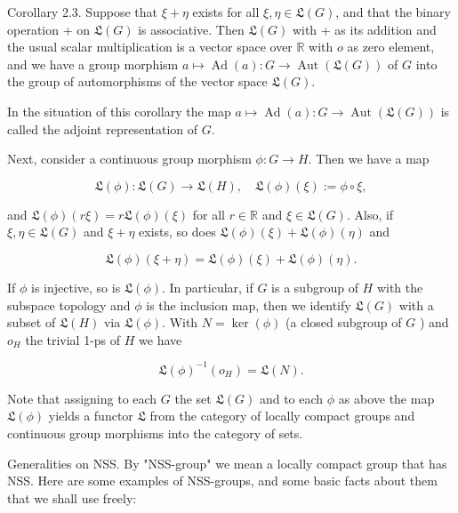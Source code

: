 \documentclass[10pt]{article}
\begin{document}
Corollary 2.3. Suppose that $\xi+\eta$ exists for all $\xi, \eta \in \mathfrak{L}(G)$, and that the binary operation + on $\mathfrak{L}(G)$ is associative. Then $\mathfrak{L}(G)$ with + as its addition and the usual scalar multiplication is a vector space over $\mathbb{R}$ with $o$ as zero element, and we have a group morphism $a \mapsto \operatorname{Ad}(a): G \rightarrow \operatorname{Aut}(\mathfrak{L}(G))$ of $G$ into the group of automorphisms of the vector space $\mathfrak{L}(G)$.

In the situation of this corollary the map $a \mapsto \operatorname{Ad}(a): G \rightarrow \operatorname{Aut}(\mathfrak{L}(G))$ is called the adjoint representation of $G$.

Next, consider a continuous group morphism $\phi: G \rightarrow H$. Then we have a map

$$
\mathfrak{L}(\phi): \mathfrak{L}(G) \rightarrow \mathfrak{L}(H), \quad \mathfrak{L}(\phi)(\xi):=\phi \circ \xi,
$$

and $\mathfrak{L}(\phi)(r \xi)=r \mathfrak{L}(\phi)(\xi)$ for all $r \in \mathbb{R}$ and $\xi \in \mathfrak{L}(G)$. Also, if $\xi, \eta \in \mathfrak{L}(G)$ and $\xi+\eta$ exists, so does $\mathfrak{L}(\phi)(\xi)+\mathfrak{L}(\phi)(\eta)$ and

$$
\mathfrak{L}(\phi)(\xi+\eta)=\mathfrak{L}(\phi)(\xi)+\mathfrak{L}(\phi)(\eta) .
$$

If $\phi$ is injective, so is $\mathfrak{L}(\phi)$. In particular, if $G$ is a subgroup of $H$ with the subspace topology and $\phi$ is the inclusion map, then we identify $\mathfrak{L}(G)$ with a\\
subset of $\mathfrak{L}(H)$ via $\mathfrak{L}(\phi)$. With $N=\operatorname{ker}(\phi)$ (a closed subgroup of $G$ ) and $o_{H}$ the trivial 1-ps of $H$ we have

$$
\mathfrak{L}(\phi)^{-1}\left(o_{H}\right)=\mathfrak{L}(N) .
$$

Note that assigning to each $G$ the set $\mathfrak{L}(G)$ and to each $\phi$ as above the map $\mathfrak{L}(\phi)$ yields a functor $\mathfrak{L}$ from the category of locally compact groups and continuous group morphisms into the category of sets.

Generalities on NSS. By "NSS-group" we mean a locally compact group that has NSS. Here are some examples of NSS-groups, and some basic facts about them that we shall use freely:
\end{document}
